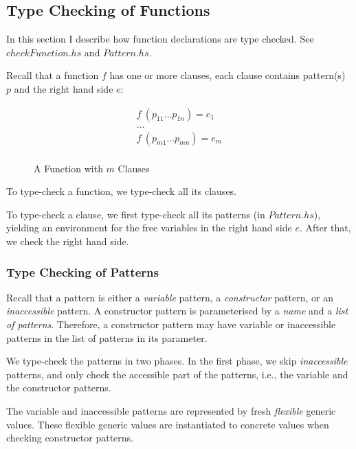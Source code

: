 \documentclass[acmsmall]{acmart}
\begin{document}
\subsection{Type Checking of Functions}

In this section I describe how function declarations are type checked. See \emph{$checkFunction.hs$} and \emph{$Pattern.hs$}.

Recall that a function $f$ has one or more clauses, each clause contains pattern(s) $p$ and the right hand side $e$:

\begin{figure}[H]
  \begin{equation*}
    \begin{aligned}
      f \: (p_{11} \dots p_{1n}) = e_1 \\
      \dots                            \\
      f \: (p_{m1} \dots p_{mn}) = e_m \\
    \end{aligned}
  \end{equation*}
  \caption{A Function with $m$ Clauses}
\end{figure}

To type-check a function, we type-check all its clauses. 

To type-check a clause, we first type-check all its patterns (in $Pattern.hs$), yielding an environment for the free variables in the right hand side $e$. After that, we check the right hand side.

\subsubsection{Type Checking of Patterns}
\label{sec:typeCheckPattern}

Recall that a pattern is either a \emph{variable} pattern, a \emph{constructor} pattern, or an \emph{inaccessible} pattern. A constructor pattern is parameterised by a \emph{name} and a \emph{list of patterns}. Therefore, a constructor pattern may have variable or inaccessible patterns in the list of patterns in its parameter. 

We type-check the patterns in two phases. In the first phase, we skip \emph{inaccessible} patterns, and only check the accessible part of the patterns, i.e., the variable and the constructor patterns. 

The variable and inaccessible patterns are represented by fresh \emph{flexible} generic values. These flexible generic values are instantiated to concrete values when checking constructor patterns. 
\end{document}
